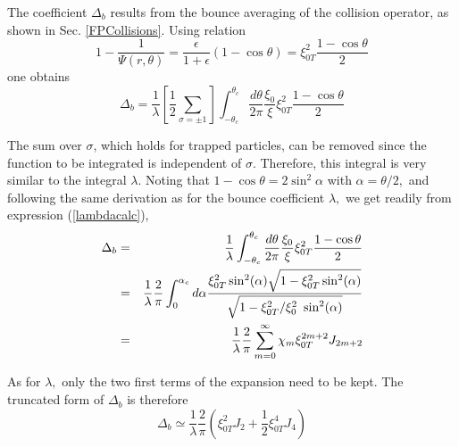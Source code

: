 The coefficient $\Delta _{b}$ results from the bounce averaging of the
collision operator, as shown in Sec. \ref{FPCollisions}. Using relation
\begin{equation}
1-\frac{1}{\Psi \left( r,\theta \right) }=\frac{\epsilon }{1+\epsilon }
\left( 1-\cos \theta \right) =\xi _{0T}^{2}\frac{1-\cos \theta }{2}
\end{equation}
one obtains
\begin{equation}
\Delta _{b}=\frac{1}{\lambda }\left[ \frac{1}{2}\sum_{\sigma =\pm 1}\right]
\int_{-\theta _{c}}^{\theta _{c}}\frac{d\theta }{2\pi }\frac{\xi _{0}}{\xi }%
\xi _{0T}^{2}\frac{1-\cos \theta }{2}
\end{equation}

The sum over $\sigma $, which holds for trapped particles, can be removed
since the function to be integrated is independent of $\sigma .$ Therefore,
this integral is very similar to the integral $\lambda .$ Noting that $%
1-\cos \theta =2\sin ^{2}\alpha $ with $\alpha =\theta /2,$ and following
the same derivation as for the bounce coefficient  $\lambda ,$ we get
readily from expression (\ref{lambdacalc}),
\begin{eqnarray}
\Delta _{b} &=&\frac{1}{\lambda }\int_{-\theta _{c}}^{\theta _{c}}\frac{%
d\theta }{2\pi }\frac{\xi _{0}}{\xi }\xi _{0T}^{2}\frac{1-\cos \theta }{2}
\nonumber \\
&=&\frac{1}{\lambda }\frac{2}{\pi }\int_{0}^{\alpha _{c}}d\alpha \frac{\xi
_{0T}^{2}\sin ^{2}(\alpha )\sqrt{1-\xi _{0T}^{2}\sin ^{2}(\alpha )}}{\sqrt{%
1-\xi _{0T}^{2}/\xi _{0}^{2}\ \sin ^{2}(\alpha )}}  \nonumber \\
&=&\frac{1}{\lambda }\frac{2}{\pi }\sum_{m=0}^{\infty }\chi _{m}\xi
_{0T}^{2m+2}J_{2m+2}
\end{eqnarray}

As for $\lambda ,$ only the two first terms of the expansion need to be
kept. The truncated form of $\Delta _{b}$ is therefore
\begin{equation}
\Delta _{b}\simeq \frac{1}{\lambda }\frac{2}{\pi }\left( \xi _{0T}^{2}J_{2}+%
\frac{1}{2}\xi _{0T}^{4}J_{4}\right)
\end{equation}

